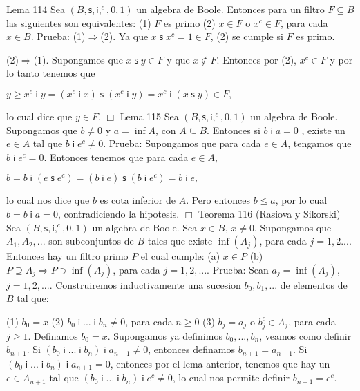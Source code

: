 Lema 114 Sea \((B,\mathsf{s},\mathsf{i},^{c},0,1)\) un algebra de Boole. Entonces para un filtro \(F\subseteq B\) las siguientes son equivalentes:
(1) \(F\) es primo
(2) \(x\in F\) o \(x^{c}\in F\), para cada \(x\in B\).
Prueba: (1)\(\Rightarrow \)(2). Ya que \(x\;\mathsf{s\;}x^{c}=1\in F\), (2) se cumple si \(F\) es primo.

(2)\(\Rightarrow \)(1). Supongamos que \(x\;\mathsf{s\;}y\in F\) y que \(x\not\in F\). Entonces por (2), \(x^{c}\in F\) y por lo tanto tenemos que

\(\displaystyle y\geq x^{c}\;\mathsf{i\;}y=(x^{c}\;\mathsf{i\;}x)\;\mathsf{s\;}(x^{c}\; \mathsf{i\;}y)=x^{c}\;\mathsf{i\;}(x\;\mathsf{s\;}y)\in F, \)

lo cual dice que \(y\in F\). \(\Box\)
Lema 115 Sea \((B,\mathsf{s},\mathsf{i},^{c},0,1)\) un algebra de Boole. Supongamos que \(b\neq 0\) y \(a=\inf A\), con \(A\subseteq B\). Entonces si \(b\;\mathsf{i\;}a=0\) , existe un \(e\in A\) tal que \(b\;\mathsf{i\;}e^{c}\neq 0\).
Prueba: Supongamos que para cada \(e\in A\), tengamos que \(b\;\mathsf{i\;}e^{c}=0\). Entonces tenemos que para cada \(e\in A\),

\(\displaystyle b=b\;\mathsf{i\;}(e\;\mathsf{s\;}e^{c})=(b\;\mathsf{i\;}e)\;\mathsf{s\;}(b\; \mathsf{i\;}e^{c})=b\;\mathsf{i\;}e, \)

lo cual nos dice que \(b\) es cota inferior de \(A\). Pero entonces \(b\leq a\), por lo cual \(b=b\;\mathsf{i\;}a=0\), contradiciendo la hipotesis. \(\Box\)
Teorema 116 (Rasiova y Sikorski) Sea \((B,\mathsf{s},\mathsf{i},^{c},0,1)\) un algebra de Boole. Sea \(x\in B\), \(x\neq 0\). Supongamos que \(A_{1},A_{2},...\) son subconjuntos de \(B\) tales que existe \(\inf (A_{j})\), para cada \(j=1,2....\) Entonces hay un filtro primo \(P\) el cual cumple:
(a) \(x\in P\)
(b) \(P\supseteq A_{j}\Rightarrow P\ni \inf (A_{j})\), para cada \( j=1,2,....\)
Prueba: Sean \(a_{j}=\inf (A_{j})\), \(j=1,2,...\). Construiremos inductivamente una sucesion \(b_{0},b_{1},...\) de elementos de \(B\) tal que:

(1) \(b_{0}=x\)
(2) \(b_{0}\;\mathsf{i\;}\)...\(\;\mathsf{i\;}b_{n}\neq 0\), para cada \( n\geq 0\)
(3) \(b_{j}=a_{j}\) o \(b_{j}^{c}\in A_{j}\), para cada \(j\geq 1\).
Definamos \(b_{0}=x\). Supongamos ya definimos \(b_{0},...,b_{n}\), veamos como definir \(b_{n+1}\). Si \((b_{0}\;\mathsf{i\;}...\;\mathsf{i\;} b_{n})\;\mathsf{i\;}a_{n+1}\neq 0\), entonces definamos \(b_{n+1}=a_{n+1}\). Si \((b_{0}\;\mathsf{i\;}...\;\mathsf{i\;}b_{n})\;\mathsf{i\;}a_{n+1}=0\), entonces por el lema anterior, tenemos que hay un \(e\in A_{n+1}\) tal que \( (b_{0}\;\mathsf{i\;}...\;\mathsf{i\;}b_{n})\;\mathsf{i\;}e^{c}\neq 0\), lo cual nos permite definir \(b_{n+1}=e^{c}\).

